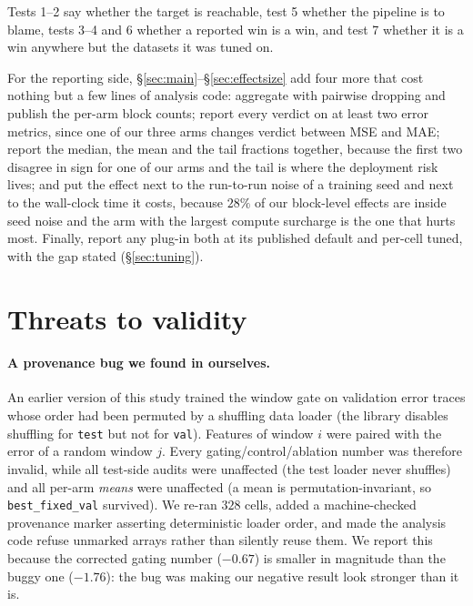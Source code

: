 \documentclass[a4paper,fleqn]{cas-sc}
\newcommand{\arm}[1]{\texttt{#1}}
\begin{document}
Tests 1--2 say whether the target is reachable, test 5 whether the pipeline is
to blame, tests 3--4 and 6 whether a reported win is a win, and test 7 whether it
is a win anywhere but the datasets it was tuned on.

For the reporting side, \S\ref{sec:main}--\S\ref{sec:effectsize} add four more
that cost nothing but a few lines of analysis code:
aggregate with pairwise dropping and publish the per-arm block counts;
report every verdict on at least two error metrics, since one of our three arms
changes verdict between MSE and MAE;
report the median, the mean and the tail fractions together, because the first
two disagree in sign for one of our arms and the tail is where the deployment
risk lives;
and put the effect next to the run-to-run noise of a training seed and next to
the wall-clock time it costs, because $28\%$ of our block-level effects are inside
seed noise and the arm with the largest compute surcharge is the one that hurts
most. Finally, report any plug-in both at its published default and per-cell
tuned, with the gap stated (\S\ref{sec:tuning}).

\section{Threats to validity}
\label{sec:threats}

\paragraph{A provenance bug we found in ourselves.}
An earlier version of this study trained the window gate on validation error
traces whose order had been permuted by a shuffling data loader (the library
disables shuffling for \texttt{test} but not for \texttt{val}). Features of
window $i$ were paired with the error of a random window $j$. Every
gating/control/ablation number was therefore invalid, while all test-side audits
were unaffected (the test loader never shuffles) and all per-arm \emph{means}
were unaffected (a mean is permutation-invariant, so
\arm{best\_fixed\_val} survived). We re-ran $328$ cells, added a machine-checked
provenance marker asserting deterministic loader order, and made the analysis
code refuse unmarked arrays rather than silently reuse them. We report this
because the corrected gating number ($-0.67$) is smaller in magnitude than the
buggy one ($-1.76$): the bug was making our negative result look stronger than
it is.
\end{document}
